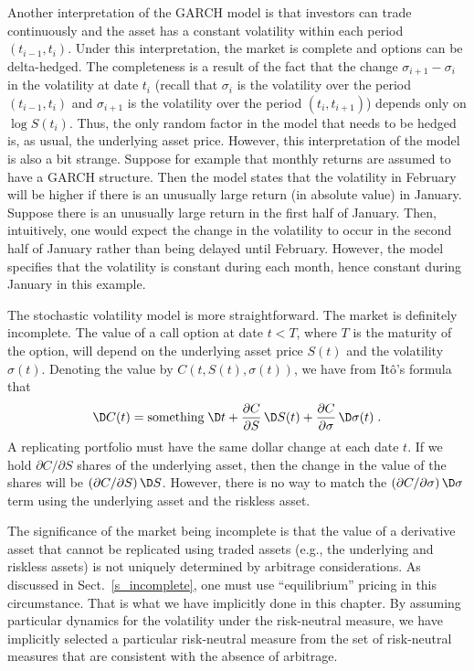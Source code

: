 Another interpretation of the GARCH model is that investors can trade continuously and the asset has a constant volatility within each period $(t_{i-1},t_i)$.  Under this interpretation, the market is complete and options can be delta-hedged.  The completeness is a result of the fact that the change $\sigma_{i+1}-\sigma_i$ in the volatility  at date $t_i$ (recall that $\sigma_i$ is the volatility over the period $(t_{i-1},t_i)$ and $\sigma_{i+1}$ is the volatility over the period $(t_{i},t_{i+1})$) depends only on $\log S(t_i)$.  Thus, the only random factor in the model that needs to be hedged is, as usual, the underlying asset price.  However, this interpretation of the model is also a bit strange.  Suppose for example that monthly returns are assumed to have a GARCH structure.  Then the model states that the volatility in February will be higher if there is an unusually large return (in absolute value) in January.  Suppose there is an unusually large return in the first half of January.  Then, intuitively, one would expect the change in the volatility to occur in the second half of January rather than being delayed until February.  However, the model specifies that the volatility is constant during each month, hence constant during January in this example.

The stochastic volatility model is more straightforward.  The market is definitely incomplete.  The value of a call option at date $t<T$, where $T$ is the maturity of the option, will depend on the underlying asset price $S(t)$ and the volatility $\sigma(t)$.  Denoting the value by $C(t,S(t),\sigma(t))$, we have
from It\^o's formula that
$$
\D C(t) = \text{something}\;\D t + \frac{\partial C}{\partial S}\,\D S(t) + \frac{\partial C}{\partial \sigma}\,\D \sigma(t)\; .$$
A replicating portfolio must have the same dollar change at each date $t$.  If we hold $\partial C/\partial S$ shares of the underlying asset, then the change in the value of the shares will be $(\partial C/\partial S)\,\D S$.  However, there is no way to match the  
$(\partial C/\partial \sigma)\,\D \sigma$ term using the underlying asset and the riskless asset.  

The significance of the market being incomplete is that the value of a derivative asset that cannot be replicated using traded assets (e.g., the underlying and riskless assets) is not uniquely determined by arbitrage considerations.  As discussed in Sect.~\ref{s_incomplete}, one must use ``equilibrium'' pricing in this circumstance.   That is what we have implicitly done in this chapter.  By assuming particular dynamics for the volatility under the risk-neutral measure, we have implicitly selected a particular risk-neutral measure from the set of risk-neutral measures that are consistent with the absence of arbitrage.  

